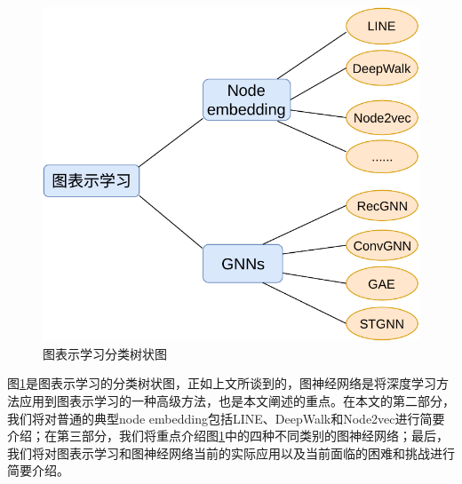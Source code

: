 \begin{figure}[!htbp]
  \centering
  \includegraphics[scale = 1]{Fig/gnn.pdf}
  \caption{图表示学习分类树状图}
  \label{fig:gnn}
\end{figure}

图\ref{fig:gnn}是图表示学习的分类树状图，正如上文所谈到的，图神经网络是将深度学习方法应用到图表示学习的一种高级方法，也是本文阐述的重点。在本文的第二部分，我们将对普通的典型node embedding包括LINE、DeepWalk和Node2vec进行简要介绍；在第三部分，我们将重点介绍图\ref{fig:gnn}中的四种不同类别的图神经网络；最后，我们将对图表示学习和图神经网络当前的实际应用以及当前面临的困难和挑战进行简要介绍。

